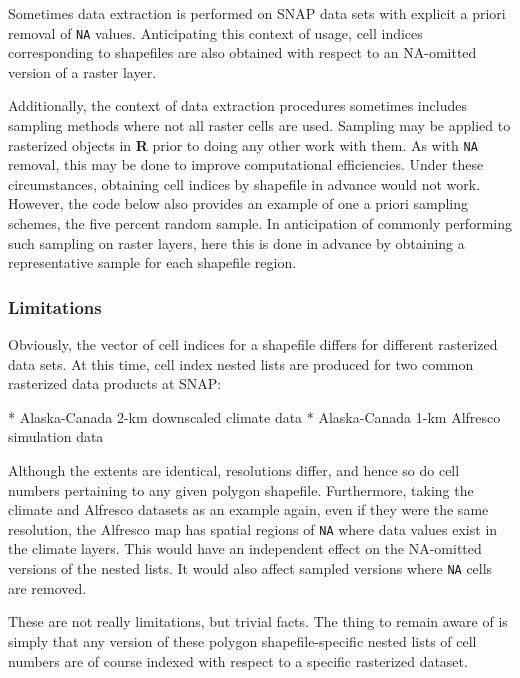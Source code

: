 \documentclass{article}\usepackage[]{graphicx}\usepackage[]{color}
\begin{document}
Sometimes data extraction is performed on SNAP data sets with explicit a priori removal of \texttt{NA} values.
Anticipating this context of usage, cell indices corresponding to shapefiles are also obtained with respect to an NA-omitted version of a raster layer.

Additionally, the context of data extraction procedures sometimes includes sampling methods where not all raster cells are used.
Sampling may be applied to rasterized objects in \textbf{R} prior to doing any other work with them.
As with \texttt{NA} removal, this may be done to improve computational efficiencies.
Under these circumstances, obtaining cell indices by shapefile in advance would not work.
However, the code below also provides an example of one a priori sampling schemes, the five percent random sample.
In anticipation of commonly performing such sampling on raster layers,
here this is done in advance by obtaining a representative sample for each shapefile region.

\subsubsection{Limitations}
Obviously, the vector of cell indices for a shapefile differs for different rasterized data sets.
At this time, cell index nested lists are produced for two common rasterized data products at SNAP:

* Alaska-Canada 2-km downscaled climate data
* Alaska-Canada 1-km Alfresco simulation data

Although the extents are identical, resolutions differ, and hence so do cell numbers pertaining to any given polygon shapefile.
Furthermore, taking the climate and Alfresco datasets as an example again, even if they were the same resolution,
the Alfresco map has spatial regions of \texttt{NA} where data values exist in the climate layers.
This would have an independent effect on the NA-omitted versions of the nested lists.
It would also affect sampled versions where \texttt{NA} cells are removed.

These are not really limitations, but trivial facts.
The thing to remain aware of is simply that any version of these polygon shapefile-specific nested lists of cell numbers are of course indexed with respect to a specific rasterized dataset.
\end{document}
